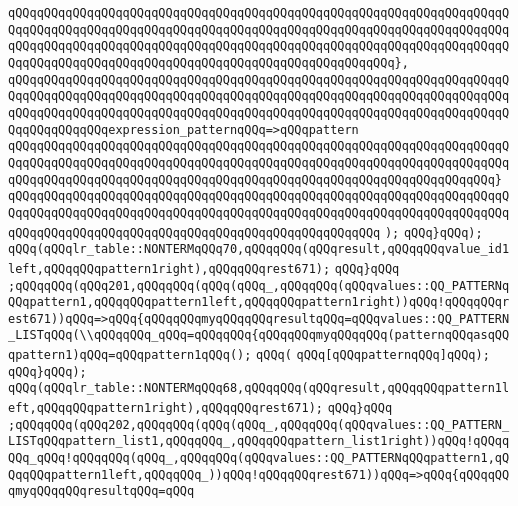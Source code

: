 \verb|qQQqqQQqqQQqqQQqqQQqqQQqqQQqqQQqqQQqqQQqqQQqqQQqqQQqqQQqqQQqqQQqqQQqqQQqqQQqqQQqqQQqqQQqqQQqqQQqqQQqqQQqqQQqqQQqqQQqqQQqqQQqqQQqqQQqqQQqqQQqqQQqqQQqqQQqqQQqqQQqqQQqqQQqqQQqqQQqqQQqqQQqqQQqqQQqqQQqqQQqqQQqqQQqqQQqqQQqqQQqqQQqqQQqqQQqqQQqqQQqqQQqqQQqqQQqqQQqqQQqqQQq},|\newline
\verb|qQQqqQQqqQQqqQQqqQQqqQQqqQQqqQQqqQQqqQQqqQQqqQQqqQQqqQQqqQQqqQQqqQQqqQQqqQQqqQQqqQQqqQQqqQQqqQQqqQQqqQQqqQQqqQQqqQQqqQQqqQQqqQQqqQQqqQQqqQQqqQQqqQQqqQQqqQQqqQQqqQQqqQQqqQQqqQQqqQQqqQQqqQQqqQQqqQQqqQQqqQQqqQQqqQQqqQQqqQQqqQQqexpression_patternqQQq=>qQQqpattern|\newline
\verb|qQQqqQQqqQQqqQQqqQQqqQQqqQQqqQQqqQQqqQQqqQQqqQQqqQQqqQQqqQQqqQQqqQQqqQQqqQQqqQQqqQQqqQQqqQQqqQQqqQQqqQQqqQQqqQQqqQQqqQQqqQQqqQQqqQQqqQQqqQQqqQQqqQQqqQQqqQQqqQQqqQQqqQQqqQQqqQQqqQQqqQQqqQQqqQQqqQQqqQQqqQQqqQQq}|\newline
\verb|qQQqqQQqqQQqqQQqqQQqqQQqqQQqqQQqqQQqqQQqqQQqqQQqqQQqqQQqqQQqqQQqqQQqqQQqqQQqqQQqqQQqqQQqqQQqqQQqqQQqqQQqqQQqqQQqqQQqqQQqqQQqqQQqqQQqqQQqqQQqqQQqqQQqqQQqqQQqqQQqqQQqqQQqqQQqqQQqqQQqqQQqqQQqqQQq|\newline
\verb|);|\newline
\verb|qQQq}qQQq);|\newline
\verb|qQQq(qQQqlr_table::NONTERMqQQq70,qQQqqQQq(qQQqresult,qQQqqQQqvalue_id1left,qQQqqQQqpattern1right),qQQqqQQqrest671);|\newline
\verb|qQQq}qQQq|\newline
\verb|;qQQqqQQq(qQQq201,qQQqqQQq(qQQq(qQQq_,qQQqqQQq(qQQqvalues::QQ_PATTERNqQQqpattern1,qQQqqQQqpattern1left,qQQqqQQqpattern1right))qQQq!qQQqqQQqrest671))qQQq=>qQQq{qQQqqQQqmyqQQqqQQqresultqQQq=qQQqvalues::QQ_PATTERN_LISTqQQq(\\qQQqqQQq_qQQq=qQQqqQQq{qQQqqQQqmyqQQqqQQq(patternqQQqasqQQqpattern1)qQQq=qQQqpattern1qQQq();|\newline
\verb|qQQq(|\newline
\verb|qQQq[qQQqpatternqQQq]qQQq);|\newline
\verb|qQQq}qQQq);|\newline
\verb|qQQq(qQQqlr_table::NONTERMqQQq68,qQQqqQQq(qQQqresult,qQQqqQQqpattern1left,qQQqqQQqpattern1right),qQQqqQQqrest671);|\newline
\verb|qQQq}qQQq|\newline
\verb|;qQQqqQQq(qQQq202,qQQqqQQq(qQQq(qQQq_,qQQqqQQq(qQQqvalues::QQ_PATTERN_LISTqQQqpattern_list1,qQQqqQQq_,qQQqqQQqpattern_list1right))qQQq!qQQqqQQq_qQQq!qQQqqQQq(qQQq_,qQQqqQQq(qQQqvalues::QQ_PATTERNqQQqpattern1,qQQqqQQqpattern1left,qQQqqQQq_))qQQq!qQQqqQQqrest671))qQQq=>qQQq{qQQqqQQqmyqQQqqQQqresultqQQq=qQQq|\newline
